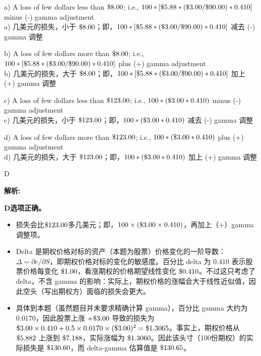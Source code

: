 \documentclass{article}
\newcommand{\dollar}{\ifmmode\text{\$}\else\$\fi}  %
\newenvironment{explanation}
{\textbf{解析:}\par}
{\par}
\begin{document}
\begin{choices}
    \item a) A loss of few dollars less than $\dollar8.00$; i.e., $100 * [\dollar5.88 * (\dollar3.00/\dollar90.00) * 0.410]$ minus (-) gamma adjustment
    \\a) 几美元的损失，小于 $\dollar8.00$；即，$100 * [\dollar5.88 * (\dollar3.00/\dollar90.00) * 0.410]$ 减去 (-) gamma 调整
    \item b) A loss of few dollars more than $\dollar8.00$; i.e., $100 * [\dollar5.88 * (\dollar3.00/\dollar90.00) * 0.410]$ plus (+) gamma adjustment
    \\b) 几美元的损失，大于 $\dollar8.00$；即，$100 * [\dollar5.88 * (\dollar3.00/\dollar90.00) * 0.410]$ 加上 (+) gamma 调整
    \item c) A loss of few dollars less than $\dollar123.00$; i.e., $100 * (\dollar3.00 * 0.410)$ minus (-) gamma adjustment
    \\c) 几美元的损失，小于 $\dollar123.00$；即，$100 * (\dollar3.00 * 0.410)$ 减去 (-) gamma 调整
    \item d) A loss of few dollars more than $\dollar123.00$; i.e., $100 * (\dollar3.00 * 0.410)$ plus (+) gamma adjustment
    \\d) 几美元的损失，大于 $\dollar123.00$；即，$100 * (\dollar3.00 * 0.410)$ 加上 (+) gamma 调整
\end{choices}

\begin{correctanswer}
    D
\end{correctanswer}

\begin{explanation}
    \textbf{D选项正确。} 
    \begin{itemize}
        \item 损失会比$\dollar123.00$多几美元；即，$100 \times (\dollar3.00 \times 0.410)$，再加上（+）gamma 调整项。
    \end{itemize}

    \begin{itemize}
        \item Delta 是期权价格对标的资产（本题为股票）价格变化的一阶导数：$\Delta = \partial c/ \partial S$，即期权价格对标的变化的敏感度。百分比 delta 为 $0.410$ 表示股票价格每变化 $\dollar1.00$，看涨期权的价格期望线性变化 $\dollar0.410$。不过这只考虑了 delta，不含 gamma 的影响：实际上，期权价格的涨幅会大于线性近似值，因此空头（写出期权方）面临的损失会更大。
    \end{itemize}
    \begin{itemize}
        \item 具体到本题（虽然题目并未要求精确计算 gamma），百分比 gamma 大约为 $0.0170$，因此股票上涨 $+\dollar3.00$ 导致的损失为 $\dollar3.00\times0.410 + 0.5\times0.0170\times(\dollar3.00)^2 = \dollar1.3065$。事实上，期权价格从 $\dollar5.882$ 上涨到 $\dollar7.188$，实际涨幅为 $\dollar1.3060$。因此该头寸（100份期权）的实际损失是 $\dollar130.60$，而 delta-gamma 估算值是 $\dollar130.65$。
    \end{itemize}
\end{explanation}
\end{document}
